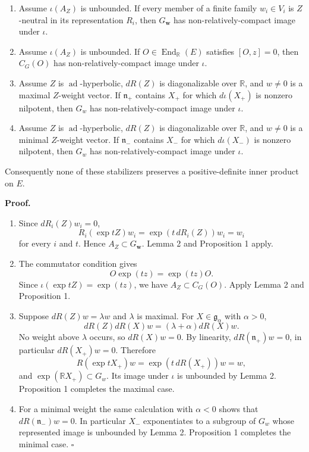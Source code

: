 \documentclass[
  10pt,
  letterpaper,
  oneside]{scrartcl}
\newcounter{none} %
\providecommand{\tightlist}{%
  \setlength{\itemsep}{0pt}\setlength{\parskip}{0pt}}
\begin{document}
\begin{enumerate}
\def\labelenumi{\arabic{enumi}.}
\tightlist
\item
  Assume \(\iota(A_Z)\) is unbounded. If every member of a finite family
  \(w_i\in V_i\) is \(Z\)-neutral in its representation \(R_i\), then
  \(G_{\mathbf w}\) has non-relatively-compact image under \(\iota\).
\item
  Assume \(\iota(A_Z)\) is unbounded. If
  \(O\in\operatorname{End}_{\mathbb R}(E)\) satisfies \([O,z]=0\), then
  \(C_G(O)\) has non-relatively-compact image under \(\iota\).
\item
  Assume \(Z\) is \(\operatorname{ad}\)-hyperbolic, \(dR(Z)\) is
  diagonalizable over \(\mathbb R\), and \(w\ne0\) is a maximal
  \(Z\)-weight vector. If \(\mathfrak n_+\) contains \(X_+\) for which
  \(d\iota(X_+)\) is nonzero nilpotent, then \(G_w\) has
  non-relatively-compact image under \(\iota\).
\item
  Assume \(Z\) is \(\operatorname{ad}\)-hyperbolic, \(dR(Z)\) is
  diagonalizable over \(\mathbb R\), and \(w\ne0\) is a minimal
  \(Z\)-weight vector. If \(\mathfrak n_-\) contains \(X_-\) for which
  \(d\iota(X_-)\) is nonzero nilpotent, then \(G_w\) has
  non-relatively-compact image under \(\iota\).
\end{enumerate}

Consequently none of these stabilizers preserves a positive-definite
inner product on \(E\).

\textbf{Proof.}

\begin{enumerate}
\def\labelenumi{\arabic{enumi}.}
\tightlist
\item
  Since \(dR_i(Z)w_i=0\), \[
  R_i(\exp tZ)w_i=\exp(t\,dR_i(Z))w_i=w_i
  \] for every \(i\) and \(t\). Hence \(A_Z\subset G_{\mathbf w}\).
  Lemma 2 and Proposition 1 apply.
\item
  The commutator condition gives \[
  O\exp(tz)=\exp(tz)O.
  \] Since \(\iota(\exp tZ)=\exp(tz)\), we have \(A_Z\subset C_G(O)\).
  Apply Lemma 2 and Proposition 1.
\item
  Suppose \(dR(Z)w=\lambda w\) and \(\lambda\) is maximal. For
  \(X\in\mathfrak g_\alpha\) with \(\alpha>0\), \[
  dR(Z)dR(X)w=(\lambda+\alpha)dR(X)w.
  \] No weight above \(\lambda\) occurs, so \(dR(X)w=0\). By linearity,
  \(dR(\mathfrak n_+)w=0\), in particular \(dR(X_+)w=0\). Therefore \[
  R(\exp tX_+)w=\exp(t\,dR(X_+))w=w,
  \] and \(\exp(\mathbb R X_+)\subset G_w\). Its image under \(\iota\)
  is unbounded by Lemma 2. Proposition 1 completes the maximal case.
\item
  For a minimal weight the same calculation with \(\alpha<0\) shows that
  \(dR(\mathfrak n_-)w=0\). In particular \(X_-\) exponentiates to a
  subgroup of \(G_w\) whose represented image is unbounded by Lemma 2.
  Proposition 1 completes the minimal case. \(\square\)
\end{enumerate}
\end{document}
